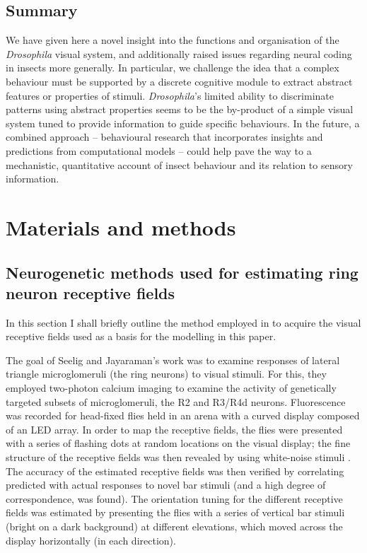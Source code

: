\documentclass[10pt]{article}
\begin{document}
\subsection*{Summary}
We have given here a novel insight into the functions and organisation of the \emph{Drosophila} visual system, and additionally raised issues regarding neural coding in insects more generally. In particular, we challenge the idea that a complex behaviour must be supported by a discrete cognitive module to extract abstract features or properties of stimuli. \emph{Drosophila}’s limited ability to discriminate patterns using abstract properties seems to be the by-product of a simple visual system tuned to provide information to guide specific behaviours. In the future, a combined approach – behavioural research that incorporates insights and predictions from computational models – could help pave the way to a mechanistic, quantitative account of insect behaviour and its relation to sensory information.

\section*{Materials and methods}
\subsection*{Neurogenetic methods used for estimating ring neuron receptive fields}
\label{sec:methods:seelig}
In this section I shall briefly outline the method employed in \cite{Seelig2013} to acquire the visual receptive fields used as a basis for the modelling in this paper.

The goal of Seelig and Jayaraman's \cite{Seelig2013} work was to examine responses of lateral triangle microglomeruli (the ring neurons) to visual stimuli.
For this, they employed two-photon calcium imaging to examine the activity of genetically targeted subsets of microglomeruli, the R2 and R3/R4d neurons.
Fluorescence was recorded for head-fixed flies held in an arena with a curved display composed of an LED array.
In order to map the receptive fields, the flies were presented with a series of flashing dots at random locations on the visual display; the fine structure of the receptive fields was then revealed by using white-noise stimuli \cite{Weber2010}.
The accuracy of the estimated receptive fields was then verified by correlating predicted with actual responses to novel bar stimuli (and a high degree of correspondence, was found).
The orientation tuning for the different receptive fields was estimated by presenting the flies with a series of vertical bar stimuli (bright on a dark background) at different elevations, which moved across the display horizontally (in each direction).
\end{document}
